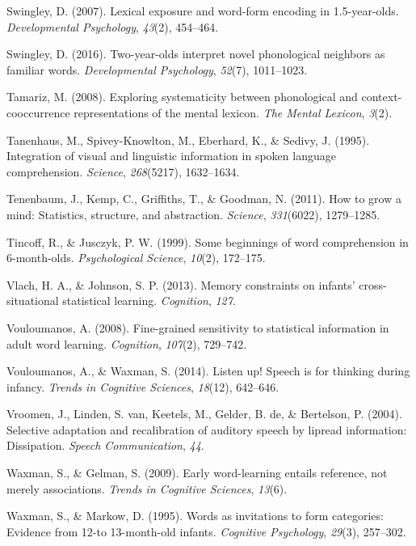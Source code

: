\documentclass[english,,man,floatsintext]{apa6}
\theoremstyle{definition}
\theoremstyle{definition}
\theoremstyle{definition}
\theoremstyle{remark}
\begin{document}
\hypertarget{ref-Swingley2007}{}
Swingley, D. (2007). Lexical exposure and word-form encoding in
1.5-year-olds. \emph{Developmental Psychology}, \emph{43}(2), 454--464.

\hypertarget{ref-Swingley2016}{}
Swingley, D. (2016). Two-year-olds interpret novel phonological
neighbors as familiar words. \emph{Developmental Psychology},
\emph{52}(7), 1011--1023.

\hypertarget{ref-Tamariz2008}{}
Tamariz, M. (2008). Exploring systematicity between phonological and
context-cooccurrence representations of the mental lexicon. \emph{The
Mental Lexicon}, \emph{3}(2).

\hypertarget{ref-Tanenhaus1995}{}
Tanenhaus, M., Spivey-Knowlton, M., Eberhard, K., \& Sedivy, J. (1995).
Integration of visual and linguistic information in spoken language
comprehension. \emph{Science}, \emph{268}(5217), 1632--1634.

\hypertarget{ref-tenenbaum11}{}
Tenenbaum, J., Kemp, C., Griffiths, T., \& Goodman, N. (2011). How to
grow a mind: Statistics, structure, and abstraction. \emph{Science},
\emph{331}(6022), 1279--1285.

\hypertarget{ref-tincoff1999}{}
Tincoff, R., \& Jusczyk, P. W. (1999). Some beginnings of word
comprehension in 6-month-olds. \emph{Psychological Science},
\emph{10}(2), 172--175.

\hypertarget{ref-vlach2013}{}
Vlach, H. A., \& Johnson, S. P. (2013). Memory constraints on infants'
cross-situational statistical learning. \emph{Cognition}, \emph{127}.

\hypertarget{ref-vouloumanos2008}{}
Vouloumanos, A. (2008). Fine-grained sensitivity to statistical
information in adult word learning. \emph{Cognition}, \emph{107}(2),
729--742.

\hypertarget{ref-vouloumanos2014}{}
Vouloumanos, A., \& Waxman, S. (2014). Listen up! Speech is for thinking
during infancy. \emph{Trends in Cognitive Sciences}, \emph{18}(12),
642--646.

\hypertarget{ref-vroomen2004}{}
Vroomen, J., Linden, S. van, Keetels, M., Gelder, B. de, \& Bertelson,
P. (2004). Selective adaptation and recalibration of auditory speech by
lipread information: Dissipation. \emph{Speech Communication},
\emph{44}.

\hypertarget{ref-waxman2009}{}
Waxman, S., \& Gelman, S. (2009). Early word-learning entails reference,
not merely associations. \emph{Trends in Cognitive Sciences},
\emph{13}(6).

\hypertarget{ref-waxman1995}{}
Waxman, S., \& Markow, D. (1995). Words as invitations to form
categories: Evidence from 12-to 13-month-old infants. \emph{Cognitive
Psychology}, \emph{29}(3), 257--302.
\end{document}
